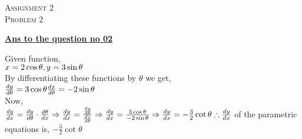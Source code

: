\documentclass{article}
\begin{document}
\begin{newpage}
\begin{flushright}
    \textsc{Assignment 2}\\
    \textsc{Problem 2}\\
    [1 cm]
    \end{flushright}
\begin{center}
  \textbf{\Large \underline {Ans to the question no 02}}\\
  [1 cm]
\end{center}
\Large {Given function,\\[3mm]
$ x=2\cos{\theta},\\[3mm]
y= 3 \sin{\theta}$\\[5mm]
By differentiating these functions by $\theta$ we get,\\[3mm]
$\frac{dy}{d\theta}= 3\cos{\theta}\\[3mm]
\frac{dx}{d\theta}= -2\sin{\theta}$\\[3mm]
Now,\\[3mm]
$\frac{dy}{dx}= \frac{dy}{d\theta} \cdot \frac{d\theta}{dx}\\[3mm] 
\Rightarrow \frac{dy}{dx}= \frac{\frac{dy}{d\theta}}{\frac{dx}{d\theta}} \\[3mm]
\Rightarrow \frac{dy}{dx}= \frac{3\cos{\theta}}{-2\sin{\theta}}\\[3mm]
\Rightarrow \frac{dy}{dx}= -\frac{3}{2}\cot{\theta}\\[3mm]
\therefore \frac{dy}{dx}$ of the parametric equations is, $-\frac{3}{2}\cot{\theta}$}
\end{newpage}
\end{document}
